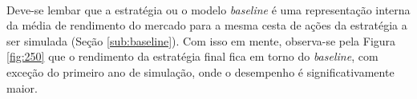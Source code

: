 
\paragraph{} Deve-se lembar que a estratégia ou o modelo \textit{baseline} é uma representação interna da média de rendimento do mercado para a mesma cesta de ações da estratégia a ser simulada (Seção \ref{sub:baseline}). Com isso em mente, observa-se pela Figura \ref{fig:250} que o rendimento da estratégia final fica em torno do \textit{baseline}, com exceção do primeiro ano de simulação, onde o desempenho é significativamente maior.

